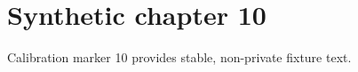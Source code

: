 \chapter{Synthetic chapter 10}\label{chap:10}
Calibration marker 10 provides stable, non-private fixture text.
